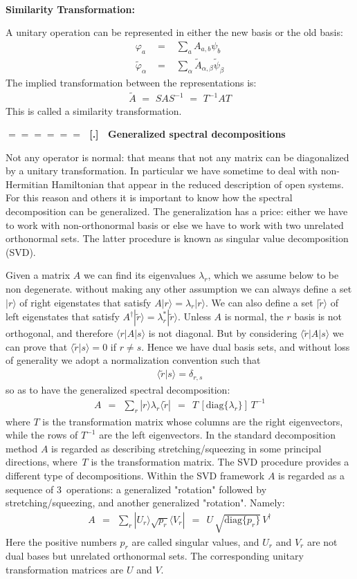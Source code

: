 \documentclass[onecolumn,fleqn]{revtex4}
\newcommand{\beq}{\begin{eqnarray}}
\newcommand{\eeq}{\end{eqnarray}}
\renewcommand{\thesubsection}{\arabic{subsection}}
\renewcommand{\thesubsubsection}{\arabic{subsubsection}}
\newcommand{\sheadC}[1]
{
\addtocounter{subsubsection}{1}
\vspace{5mm}
{\Large\bf $=\!=\!=\!=\!=\!=\;$ [\thesubsection.\thesubsubsection] \ #1}  
\nopagebreak
\phantomsection
}
\begin{document}
 
\ \\
{\bf Similarity Transformation:} 

A unitary operation can be represented 
in either the new basis or the old basis:
\beq
\varphi_{a} \,\, 
&=& \,\, \sum_a A_{a,b} \psi_b 
\\ \nonumber
\tilde{\varphi}_{\alpha} \,\, 
&=& \,\, \sum_{\alpha} \tilde{A}_{\alpha,\beta} \tilde{\psi}_{\beta} 
\eeq
The implied transformation between 
the representations is:
\beq
\tilde{A} \,\, = \,\, S A S^{-1} \,\, = \,\, T^{-1} A T 
\eeq
This is called a similarity transformation. 



\sheadC{Generalized spectral decompositions}

Not any operator is normal: that means that not any matrix 
can be diagonalized by a unitary transformation. In particular 
we have sometime to deal with non-Hermitian Hamiltonian that 
appear in the reduced description of open systems. 
For this reason and others it is important to know how 
the spectral decomposition can be generalized. The generalization 
has a price: either we have to work with non-orthonormal basis 
or else we have to work with two unrelated orthonormal sets.
The latter procedure is known as singular value decomposition (SVD). 


Given a matrix $A$ we can find its eigenvalues $\lambda_r$, 
which we assume below to be non degenerate. without making any 
other assumption we can always define a set $|r\rangle$ 
of right eigenstates that satisfy ${A|r\rangle = \lambda_r |r\rangle}$.
We can also define a set $|\tilde{r}\rangle$ of left eigenstates  
that satisfy ${A^{\dag}|\tilde{r}\rangle = \lambda_r^* |\tilde{r}\rangle}$.
Unless $A$ is normal, the $r$ basis is not orthogonal, 
and therefore ${\langle r|A| s\rangle}$ 
is not diagonal. But by considering ${\langle \tilde{r}|A| s\rangle}$ 
we can prove that ${\langle \tilde{r}|s\rangle =0}$ if ${r \ne s}$.  
Hence we have dual basis sets, and without loss of generality 
we adopt a normalization convention such that 
\beq
\langle \tilde{r} | s\rangle = \delta_{r,s}
\eeq
so as to have the generalized spectral decomposition:
\beq
A \ \ = \ \ \sum_r  | r \rangle \lambda_r \langle \tilde{r} | 
\ \ = \ \ T \,\left[\mbox{diag}\{\lambda_r\}\right]\,T^{-1}
\eeq
where $T$ is the transformation matrix 
whose columns are the right eigenvectors, 
while the rows of $T^{-1}$ are the left eigenvectors. 
In the standard decomposition method $A$ 
is regarded as describing stretching/squeezing 
in some principal directions, where~$T$ 
is the transformation matrix.   
The SVD procedure provides a different 
type of decompositions. Within the SVD framework $A$ is 
regarded as a sequence of 3~operations: 
a generalized "rotation" followed by stretching/squeezing, 
and another generalized "rotation". Namely:   
\beq
A \ \ = \ \ \sum_r  |U_r\rangle \sqrt{p_r} \langle V_r| 
\ \ = \ \ U\,\sqrt{\mbox{diag}\{p_r\}}\,V^{\dagger}
\eeq
Here the positive numbers $p_r$ are called singular values, 
and $U_r$ and $V_r$ are not dual bases 
but unrelated orthonormal sets. The corresponding 
unitary transformation matrices are $U$ and $V$.
\end{document}
